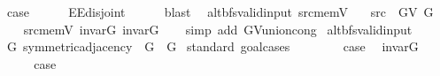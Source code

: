 \begin{isabellebody}
\ {\isacharquery}{\kern0pt}case\isanewline
\ \ \ \ \isamarkupfalse%
\ E{}{\isacharunderscore}{\kern0pt}E{}{\isacharunderscore}{\kern0pt}disjoint\isanewline
\ \ \ \ \isamarkupfalse%
\ blast\isanewline
{}\isamarkupfalse%
%
\endisatagproof
{\isafoldproof}%
%
\isadelimproof
\isanewline
%
\endisadelimproof
\isanewline
{}\isamarkupfalse%
\ {\isacharparenleft}{\kern0pt}\ alt{\isacharunderscore}{\kern0pt}bfs{\isacharunderscore}{\kern0pt}valid{\isacharunderscore}{\kern0pt}input{\isacharparenright}{\kern0pt}\ src{\isacharunderscore}{\kern0pt}mem{\isacharunderscore}{\kern0pt}V{\isacharcolon}{\kern0pt}\isanewline
\ \ \ {\isachardoublequoteopen}src\ {\isasymin}\ G{\isachardot}{\kern0pt}V\ G{\isachardoublequoteclose}\isanewline
%
\isadelimproof
\ \ %
\endisadelimproof
%
\isatagproof
{}\isamarkupfalse%
\ src{\isacharunderscore}{\kern0pt}mem{\isacharunderscore}{\kern0pt}V{}\ invar{\isacharunderscore}{\kern0pt}G{}\ invar{\isacharunderscore}{\kern0pt}G{}\isanewline
\ \ \isamarkupfalse%
\ {\isacharparenleft}{\kern0pt}simp\ add{\isacharcolon}{\kern0pt}\ G{\isachardot}{\kern0pt}V{\isacharunderscore}{\kern0pt}union{\isacharunderscore}{\kern0pt}cong{\isacharparenright}{\kern0pt}%
\endisatagproof
{\isafoldproof}%
%
\isadelimproof
\isanewline
%
\endisadelimproof
\isanewline
{}\isamarkupfalse%
\ alt{\isacharunderscore}{\kern0pt}bfs{\isacharunderscore}{\kern0pt}valid{\isacharunderscore}{\kern0pt}input\isanewline
{}\isanewline
\isanewline
{}\isamarkupfalse%
\ G{}{\isacharcolon}{\kern0pt}\ symmetric{\isacharunderscore}{\kern0pt}adjacency\ \ G\ {\isacharequal}{\kern0pt}\ G{}\isanewline
%
\isadelimproof
%
\endisadelimproof
%
\isatagproof
{}\isamarkupfalse%
\ {\isacharparenleft}{\kern0pt}standard{\isacharcomma}{\kern0pt}\ goal{\isacharunderscore}{\kern0pt}cases{\isacharparenright}{\kern0pt}\isanewline
\ \ \isamarkupfalse%
\ {}\isanewline
\ \ \isamarkupfalse%
\ {\isacharquery}{\kern0pt}case\ \isamarkupfalse%
\ invar{\isacharunderscore}{\kern0pt}G{}\ \isacommand{{\isachardot}{\kern0pt}}\isamarkupfalse%
\isanewline
{}\isamarkupfalse%
\isanewline
\ \ \isamarkupfalse%
\ {}\isanewline
\ \ \isamarkupfalse%
\ {\isacharquery}{\kern0pt}case\ \isamarkupfalse%

\end{isabellebody}
